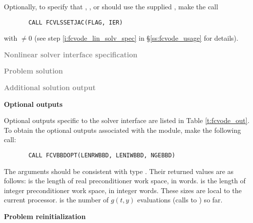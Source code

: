 \begin{Steps}
  Optionally, to specify that {\spgmr}, {\spbcg}, or {\sptfqmr} should use 
  the supplied , make the call
\begin{verbatim}
       CALL FCVLSSETJAC(FLAG, IER)
\end{verbatim}
  with  $\neq 0$ 
  (see step \ref{i:fcvode_lin_solv_spec} in \S\ref{ss:fcvode_usage} for details).


\item \textcolor{gray}{\bf Nonlinear solver interface specification}
  
\item \textcolor{gray}{\bf Problem solution}
  
\item \textcolor{gray}{\bf Additional solution output}
  
\item {\bf {\cvbbdpre} Optional outputs}
  
  Optional outputs specific to the {\cvls} solver interface are 
  listed in Table \ref{t:fcvode_out}.
  To obtain the optional outputs associated with the {\cvbbdpre} module, make
  the following call:
\begin{verbatim}
       CALL FCVBBDOPT(LENRWBBD, LENIWBBD, NGEBBD)
\end{verbatim}
  The arguments should be consistent with {\CC} type .  Their
  returned values are as follows:
   is the length of real preconditioner work space, in 
  words.  is the length of integer preconditioner work space, in
  integer words.  These sizes are local to the current processor.
   is the number of $g(t,y)$ evaluations (calls to ) so far.
  
\item {\bf Problem reinitialization}
  

\end{Steps}
